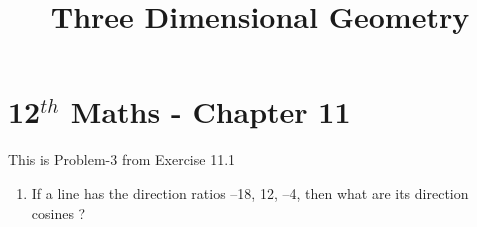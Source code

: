 \documentclass[12pt]{article}
\begin{document}
\begin{center}
\enlargethispage{-4cm}
\title{\textbf{Three Dimensional Geometry}}
\date{\vspace{-5ex}} %
\maketitle
\end{center}
\setcounter{page}{1}
\section*{12$^{th}$ Maths - Chapter 11}
This is Problem-3 from Exercise 11.1
\begin{enumerate}
\item If a line has the direction ratios –18, 12, –4, then what are its direction cosines ?


\end{enumerate}
\end{document}
